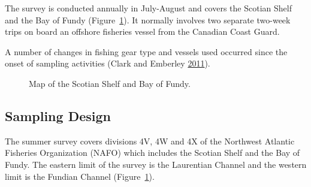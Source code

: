 \documentclass[12pt]{article}\usepackage[]{graphicx}\usepackage[]{color}
\begin{document}
The survey is conducted annually in July-August and covers the Scotian Shelf and the Bay of Fundy (Figure~\ref{fig:map1}). It normally involves two separate two-week trips on board an offshore fisheries vessel from the Canadian Coast Guard.

A number of changes in fishing gear type and vessels used occurred since the onset of sampling activities (Clark and Emberley \protect\hyperlink{ref-ClarkEmberley2011}{2011}).


\begin{figure}[htb]

{\centering {} 

}

\caption{Map of the Scotian Shelf and Bay of Fundy.}\label{fig:map1}
\end{figure}
\hypertarget{sampling-design}{%
\subsection{Sampling Design}\label{sampling-design}}

The summer survey covers divisions 4V, 4W and 4X of the Northwest Atlantic Fisheries Organization (NAFO) which includes the Scotian Shelf and the Bay of Fundy. The eastern limit of the survey is the Laurentian Channel and the western limit is the Fundian Channel (Figure~\ref{fig:map1}).
\end{document}
